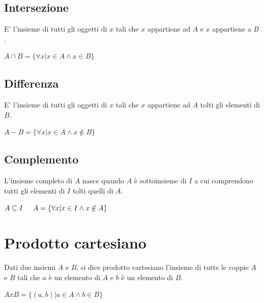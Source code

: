 \subsection*{Intersezione}
    E' l'insieme di tutti gli oggetti di $x$ tali che $x$ appartiene ad $A$ e $x$ appartiene a $B$.\begin{center}$A \cap B = \{\forall x|x\in A \wedge x\in B\}$\end{center}

\subsection*{Differenza}
    E' l'insieme di tutti gli oggetti di $x$ tali che $x$ appartiene ad $A$ tolti gli elementi di $B$.\begin{center}$A-B = \{\forall x|x\in A \wedge x\notin B\}$\end{center}

\subsection*{Complemento}
    L'insieme completo di $A$ nasce quando $A$ è sottoinsieme di $I$ a cui comprendono tutti gli elementi di $I$ tolti quelli di $A$.\begin{center}$A \subseteq I\hspace{0,5cm} A=\{\forall x|x\in I \wedge x\notin A\}$\end{center}

\section{Prodotto cartesiano}
\begin{definition}
    Dati due insiemi $A$ e $B$, si dice prodotto cartesiano l'insieme di tutte le coppie $A$ e $B$ tali che $a$ è un elemento di $A$ e $b$ è un elemento di $B$.\begin{center}$AxB = \{(a,b)|a\in A \wedge b\in B\}$\end{center}
\end{definition}

